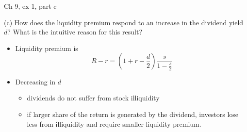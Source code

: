 \documentclass[english,10pt
,aspectratio=169
]{beamer}
\begin{document}
\begin{frame}{Ch 9, ex 1, part c}
	\begin{exampleblock}{}
		(c) How does the liquidity premium respond to an increase in the
		dividend yield $d$? What is the intuitive reason for this result?
	\end{exampleblock}
	
	\pause
	
	\begin{itemize}
		\item Liquidity premium is 
		\[ R-r = \left(1+r-\frac{d}{2}\right) \frac{s}{1-\frac{s}{2}} \]
		\item Decreasing in $d$
		\begin{itemize}
			\item dividends do not suffer from stock illiquidity
			\item if larger share of the return is generated by the dividend, investors lose less from illiquidity and require smaller liquidity premium.
		\end{itemize}
	\end{itemize}
\end{frame}
\end{document}

